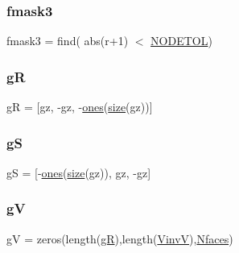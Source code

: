 \mbox{\label{a00473_afa6c03554970806d170ae51e45e92765}} 
\subsubsection{\texorpdfstring{fmask3}{fmask3}}
{\footnotesize\ttfamily fmask3 = find( abs(r+1) $<$ \hyperlink{a00575_a409781c62c346e9048df00ae7d289582}{N\+O\+D\+E\+T\+OL})\textquotesingle{}}

\mbox{\label{a00473_acbf1a23eea93c85cd113589566865e49}} 
\subsubsection{\texorpdfstring{gR}{gR}}
{\footnotesize\ttfamily gR = \mbox{[}gz, -\/gz, -\/\hyperlink{a00473_a6d4fbbd46e46569dab2b0ad8372e0220}{ones}(\hyperlink{a00611_ad6cb0afbbe6ea4f56407890be2533966}{size}(gz))\mbox{]}}

\mbox{\label{a00473_a51eed178703fb32c103fbb5565b564f1}} 
\subsubsection{\texorpdfstring{gS}{gS}}
{\footnotesize\ttfamily gS = \mbox{[}-\/\hyperlink{a00473_a6d4fbbd46e46569dab2b0ad8372e0220}{ones}(\hyperlink{a00611_ad6cb0afbbe6ea4f56407890be2533966}{size}(gz)), gz, -\/gz\mbox{]}}

\mbox{\label{a00473_a2a3aaeecb452e864ff43bf3a5050191a}} 
\subsubsection{\texorpdfstring{gV}{gV}}
{\footnotesize\ttfamily gV = zeros(length(\hyperlink{a00473_acbf1a23eea93c85cd113589566865e49}{gR}),length(\hyperlink{a00473_a8ef32285093ff36729ef70bb1e8149c4}{VinvV}),\hyperlink{a00575_aac4846947deeade1c4227c400ab38c13}{Nfaces})}

